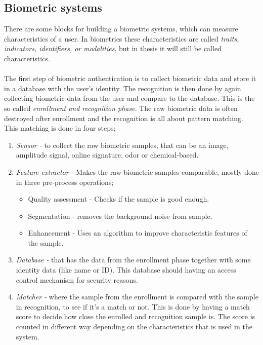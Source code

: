 \subsection{Biometric systems}\label{sec:bioSys}
There are some blocks for building a biometric systems, which can measure characteristics of a user. In biometrics these characteristics are called \textit{traits, indicators, identifiers, or modalities}, but in thesis it will still be called characteristics.\\
\\
The first step of biometric authentication is to collect biometric data and store it in a database with the user’s identity. The recognition is then done by again collecting biometric data from the user and compare to the database. This is the so called \textit{enrollment and recognition phase}. The raw biometric data is often destroyed after enrollment and the recognition is all about pattern matching. This matching is done in four steps;
\begin{enumerate}
	\item \textit{Sensor -} to collect the raw biometric samples, that can be an image, amplitude signal, online signature, odor or chemical-based.
	\item \textit{Feature extractor -} Makes the raw biometric samples comparable, mostly done in three pre-process operations; 
	\begin{itemize}
    	\item Quality assessment - Checks if the sample is good enough.
		\item Segmentation - removes the background noise from sample.
		\item Enhancement - Uses an algorithm to improve characteristic features of the sample.
    \end{itemize}
	\item \textit{Database -} that has the data from the enrollment phase together with some identity data (like name or ID). This database should having an access control mechanism for security reasons.
	\item \textit{Matcher -} where the sample from the enrollment is compared with the sample in recognition, to see if it's a match or not. This is done by having a match score to decide how close the enrolled and recognition sample is. The score is counted in different way depending on the characteristics that is used in the system. 
\end{enumerate}
\cite[ch.~1]{introbio}

